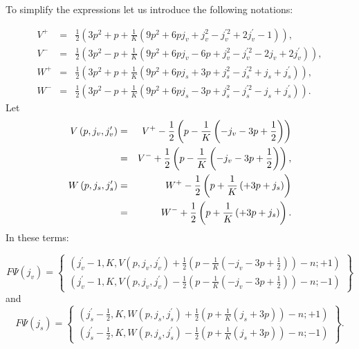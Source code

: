 \documentclass{article}
\begin{document}
To simplify the expressions let us introduce the following notations:

\begin{eqnarray*}
V^{+} &=&\frac{1}{2}\left( 3p^{2}+p+\frac{1}{K}\left(
9p^{2}+6pj_{v}+j_{v}^{2}-j_{v}^{\prime 2}+2j_{v}^{\prime }-1\right) \right) ,
\\
V^{-} &=&\frac{1}{2}\left( 3p^{2}-p+\frac{1}{K}\left(
9p^{2}+6pj_{v}-6p+j_{v}^{2}-j_{v}^{\prime 2}-2j_{v}+2j_{v}^{\prime }\right)
\right) , \\
W^{+} &=&\frac{1}{2}\left( 3p^{2}+p+\frac{1}{K}\left(
9p^{2}+6pj_{s}+3p+j_{s}^{2}-j_{s}^{\prime 2}+j_{s}+j_{s}^{\prime }\right)
\right) , \\
W^{-} &=&\frac{1}{2}\left( 3p^{2}-p+\frac{1}{K}\left(
9p^{2}+6pj_{s}-3p+j_{s}^{2}-j_{s}^{\prime 2}-j_{s}+j_{s}^{\prime }\right)
\right) .
\end{eqnarray*}
Let 
\begin{eqnarray*}
V\left( p,j_{v},j_{v}^{\prime }\right) &=&V^{+}-\frac{1}{2}\left( p-\frac{1}{%
K}\left( -j_{v}-3p+\frac{1}{2}\right) \right) \\
&=&V^{-}+\frac{1}{2}\left( p-\frac{1}{K}\left( -j_{v}-3p+\frac{1}{2}\right)
\right) , \\
W\left( p,j_{s},j_{s}^{\prime }\right) &=&W^{+}-\frac{1}{2}\left( p+\frac{1}{%
K}\left( +3p+j_{s}\right) \right) \\
&=&W^{-}+\frac{1}{2}\left( p+\frac{1}{K}\left( +3p+j_{s}\right) \right) .
\end{eqnarray*}
In these terms:

\begin{equation*}
F\Psi \left( j_{v}\right) =\left\{ 
\begin{array}{c}
\left( j_{v}^{\prime }-1,K,V\left( p,j_{v},j_{v}^{\prime }\right) +\frac{1}{2%
}\left( p-\frac{1}{K}\left( -j_{v}-3p+\frac{1}{2}\right) \right) -n;+1\right)
\\ 
\left( j_{v}^{\prime }-1,K,V\left( p,j_{v},j_{v}^{\prime }\right) -\frac{1}{2%
}\left( p-\frac{1}{K}\left( -j_{v}-3p+\frac{1}{2}\right) \right) -n;-1\right)
\end{array}
\right\}
\end{equation*}
and 
\begin{equation*}
F\Psi \left( j_{s}\right) =\left\{ 
\begin{array}{c}
\left( j_{s}^{\prime }-\frac{1}{2},K,W\left( p,j_{s},j_{s}^{\prime }\right) +%
\frac{1}{2}\left( p+\frac{1}{K}\left( j_{s}+3p\right) \right) -n;+1\right)
\\ 
\left( j_{s}^{\prime }-\frac{1}{2},K,W\left( p,j_{s},j_{s}^{\prime }\right) -%
\frac{1}{2}\left( p+\frac{1}{K}\left( j_{s}+3p\right) \right) -n;-1\right)
\end{array}
\right\} .
\end{equation*}
\end{document}
